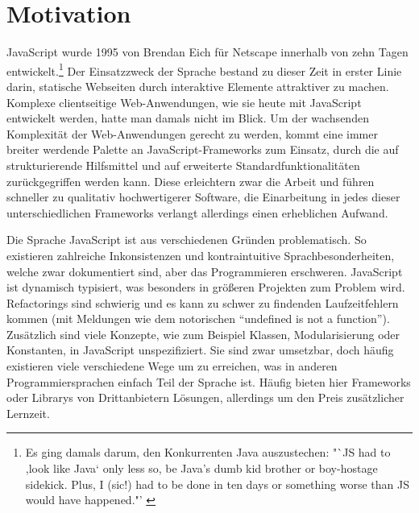 \documentclass[a4paper, 12pt, hidelinks, listof=totoc, listoftables=totoc, bibliography=totoc]{scrreprt}
\begin{document}
\section{Motivation}

JavaScript wurde 1995 von Brendan Eich für Netscape innerhalb von zehn Tagen entwickelt.\footnote{Es ging damals darum, den Konkurrenten Java auszustechen: "`JS had to ,look like Java` only less so, be Java's dumb kid brother or boy-hostage sidekick. Plus, I (sic!) had to be done in ten days or something worse than JS would have happened."' \cite{eich2010.KBE}}  Der Einsatzzweck der Sprache bestand zu dieser Zeit in erster Linie darin, statische Webseiten durch interaktive Elemente attraktiver zu machen. Komplexe clientseitige Web-Anwendungen, wie sie heute mit JavaScript entwickelt werden, hatte man damals nicht im Blick. Um der wachsenden Komplexität der Web-Anwendungen gerecht zu werden, kommt eine immer breiter werdende Palette an JavaScript-Frameworks zum Einsatz, durch die auf strukturierende Hilfsmittel und auf erweiterte Standardfunktionalitäten zurückgegriffen werden kann. Diese erleichtern zwar die Arbeit und führen schneller zu qualitativ hochwertigerer Software, die Einarbeitung in jedes dieser unterschiedlichen Frameworks verlangt allerdings einen erheblichen Aufwand.

Die Sprache JavaScript ist aus verschiedenen Gründen problematisch. So existieren zahlreiche Inkonsistenzen und kontraintuitive Sprachbesonderheiten, welche zwar dokumentiert sind, aber das Programmieren erschweren. JavaScript ist dynamisch typisiert, was besonders in größeren Projekten zum Problem wird. Refactorings sind schwierig und es kann zu schwer zu findenden Laufzeitfehlern kommen (mit Meldungen wie dem notorischen "`undefined is not a function"'). Zusätzlich sind viele Konzepte, wie zum Beispiel Klassen, Modularisierung oder Konstanten, in JavaScript unspezifiziert. Sie sind zwar umsetzbar, doch häufig existieren viele verschiedene Wege um zu erreichen, was in anderen Programmiersprachen einfach Teil der Sprache ist. Häufig bieten hier Frameworks oder Librarys von Drittanbietern Lösungen, allerdings um den Preis zusätzlicher Lernzeit.

\end{document}
